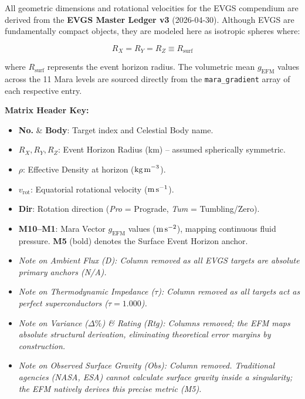 \documentclass[11pt, a4paper]{article}
\begin{document}
All geometric dimensions and rotational velocities for the EVGS compendium are derived from the \textbf{EVGS Master Ledger v3} (2026-04-30). Although EVGS are fundamentally compact objects, they are modeled here as isotropic spheres where:

\begin{equation}
  R_X = R_Y = R_Z \equiv R_{\text{surf}}
\end{equation}

where $R_{\text{surf}}$ represents the event horizon radius. The volumetric mean $g_{\text{EFM}}$ values across the 11 Mara levels are sourced directly from the \texttt{mara\_gradient} array of each respective entry.

\vspace{1em}
\noindent \textbf{Matrix Header Key:}
\begin{itemize}
  \item \textbf{No.} \& \textbf{Body}: Target index and Celestial Body name.
  \item \textbf{$R_X, R_Y, R_Z$}: Event Horizon Radius (km) -- assumed spherically symmetric.
  \item \textbf{$\rho$}: Effective Density at horizon ($\text{kg\,m}^{-3}$).
  \item \textbf{$v_{\text{rot}}$}: Equatorial rotational velocity ($\text{m\,s}^{-1}$).
  \item \textbf{Dir}: Rotation direction (\textit{Pro} = Prograde, \textit{Tum} = Tumbling/Zero).
  \item \textbf{M10--M1}: Mara Vector $g_{\text{EFM}}$ values ($\text{m\,s}^{-2}$), mapping continuous fluid pressure. \textbf{M5} (bold) denotes the Surface Event Horizon anchor.
  \item \textit{Note on Ambient Flux (D): Column removed as all EVGS targets are absolute primary anchors (N/A).}
  \item \textit{Note on Thermodynamic Impedance ($\tau$): Column removed as all targets act as perfect superconductors ($\tau = 1.000$).}
  \item \textit{Note on Variance ($\Delta\%$) \& Rating (Rtg): Columns removed; the EFM maps absolute structural derivation, eliminating theoretical error margins by construction.}
  \item \textit{Note on Observed Surface Gravity (Obs): Column removed. Traditional agencies (NASA, ESA) cannot calculate surface gravity inside a singularity; the EFM natively derives this precise metric (M5).}
\end{itemize}
\end{document}
